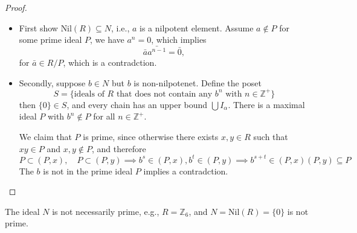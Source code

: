 \begin{proof}
\begin{itemize}
\item
First show $\mbox{Nil}(R)\subseteq N$, i.e., $a$ is a nilpotent element. Assume $a\notin P$ for some prime ideal $P$, we have $a^n=0$, which implies
\[
\bar{a}\bar{a^{n-1}}=\bar0,
\]
for $\bar{a}\in R/P$, which is a contradction.
\item
Secondly, suppose $b\in N$ but $b$ is non-nilpotenet. Define the poset
\[
S=\{\mbox{ideals of $R$ that does not contain any $b^n$ with $n\in\mathbb{Z}^+$}\}
\]
then $\{0\}\in S$, and every chain has an upper bound $\bigcup I_\alpha$. There is a maximal ideal $P$ with $b^n\notin P$ for all $n\in\mathbb{Z}^+$. 

We claim that $P$ is prime, since otherwise there exists $x,y\in R$ such that $xy\in P$ and $x,y\notin P$, and therefore
\[
P\subset(P,x),\quad P\subset(P,y)\implies
b^s\in(P,x),b^t\in(P,y)\implies
b^{s+t}\in(P,x)(P,y)\subseteq P
\]
The $b$ is not in the prime ideal $P$ implies a contradction. 
\end{itemize}
\end{proof}
\begin{remark}
The ideal $N$ is not necessarily prime, e.g., $R=\mathbb{Z}_6$, and $N=\mbox{Nil}(R)=\{0\}$ is not prime.
\end{remark}


